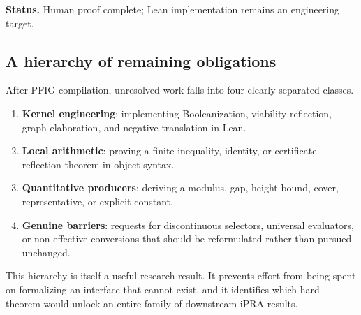 \textbf{Status.} Human proof complete; Lean implementation remains an engineering target.

\subsection{A hierarchy of remaining obligations}

After PFIG compilation, unresolved work falls into four clearly separated classes.

\begin{enumerate}
\item \textbf{Kernel engineering}: implementing Booleanization, viability reflection, graph elaboration, and negative translation in Lean.
\item \textbf{Local arithmetic}: proving a finite inequality, identity, or certificate reflection theorem in object syntax.
\item \textbf{Quantitative producers}: deriving a modulus, gap, height bound, cover, representative, or explicit constant.
\item \textbf{Genuine barriers}: requests for discontinuous selectors, universal evaluators, or non-effective conversions that should be reformulated rather than pursued unchanged.
\end{enumerate}

This hierarchy is itself a useful research result.  It prevents effort from being spent on formalizing an interface that cannot exist, and it identifies which hard theorem would unlock an entire family of downstream iPRA results.

